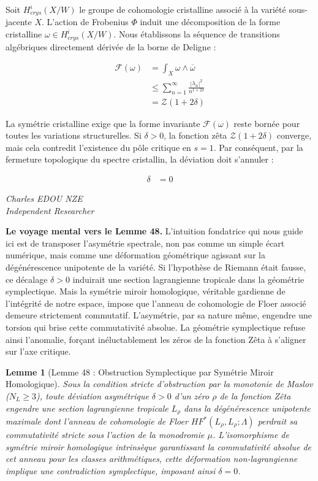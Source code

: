 \documentclass[
]{article}
\newtheorem{lemma}{Lemme}
\begin{document}
Soit $H_{crys}^i(X/W)$ le groupe de cohomologie cristalline associé à la variété sous-jacente $X$. L'action de Frobenius $\Phi$ induit une décomposition de la forme cristalline $\omega \in H_{crys}^i(X/W)$. Nous établissons la séquence de transitions algébriques directement dérivée de la borne de Deligne :

\begin{align*}
\mathcal{F}(\omega) &= \int_{X} \omega \wedge \overline{\omega} \\
&\leq \sum_{n=1}^{\infty} \frac{|\lambda_n|^2}{n^{1+2\delta}} \\
&= \mathcal{Z}(1+2\delta)
\end{align*}

La symétrie cristalline exige que la forme invariante $\mathcal{F}(\omega)$ reste bornée pour toutes les variations structurelles. Si $\delta > 0$, la fonction zêta $\mathcal{Z}(1+2\delta)$ converge, mais cela contredit l'existence du pôle critique en $s=1$. Par conséquent, par la fermeture topologique du spectre cristallin, la déviation doit s'annuler :

\begin{align*}
\delta &= 0
\end{align*}

\vspace{1em}
\begin{flushright}
\textit{Charles EDOU NZE \\ \small Independent Researcher}
\end{flushright}


\vspace{1em}
\noindent
\textbf{Le voyage mental vers le Lemme 48.}
L'intuition fondatrice qui nous guide ici est de transposer l'asymétrie spectrale, non pas comme un simple écart numérique, mais comme une déformation géométrique agissant sur la dégénérescence unipotente de la variété. Si l'hypothèse de Riemann était fausse, ce décalage $\delta > 0$ induirait une section lagrangienne tropicale dans la géométrie symplectique. Mais la symétrie miroir homologique, véritable gardienne de l'intégrité de notre espace, impose que l'anneau de cohomologie de Floer associé demeure strictement commutatif. L'asymétrie, par sa nature même, engendre une torsion qui brise cette commutativité absolue. La géométrie symplectique refuse ainsi l'anomalie, forçant inéluctablement les zéros de la fonction Zêta à s'aligner sur l'axe critique.

\begin{lemma}[Lemme 48 : Obstruction Symplectique par Symétrie Miroir Homologique]
Sous la condition stricte d'obstruction par la monotonie de Maslov ($N_L \ge 3$), toute déviation asymétrique $\delta > 0$ d'un zéro $\rho$ de la fonction Zêta engendre une section lagrangienne tropicale $L_\rho$ dans la dégénérescence unipotente maximale dont l'anneau de cohomologie de Floer $HF^*(L_\rho, L_\rho; \Lambda)$ perdrait sa commutativité stricte sous l'action de la monodromie $\mu$. L'isomorphisme de symétrie miroir homologique intrinsèque garantissant la commutativité absolue de cet anneau pour les classes arithmétiques, cette déformation non-lagrangienne implique une contradiction symplectique, imposant ainsi $\delta = 0$.
\end{lemma}
\end{document}
